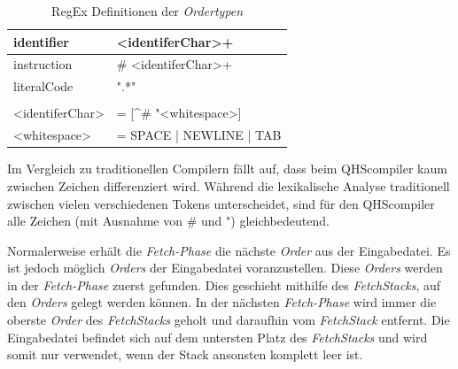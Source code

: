 \begin{table}[h]
    \centering
    \caption{RegEx Definitionen der \textit{Ordertypen}}
    \vspace{3mm} %
    
    \begin{tabular}{l>{\listingFont\selectfont}l}
    \multicolumn{1}{l|}{identifier}        & \textless{}identiferChar\textgreater{}+                           \\ \hline
    \multicolumn{1}{l|}{instruction}       & \# \textless{}identiferChar\textgreater{}+                        \\ \hline
    \multicolumn{1}{l|}{literalCode}       & ".*"                                                              \\
                                           &                                                                   \\
    \textless{}identiferChar\textgreater{} & = {[}\textasciicircum{}\# "\textless{}whitespace\textgreater{}{]} \\
    \textless{}whitespace\textgreater{}    & = SPACE | NEWLINE | TAB
    
    \end{tabular}
\end{table}

Im Vergleich zu traditionellen Compilern fällt auf, dass beim QHScompiler kaum zwischen Zeichen differenziert wird. Während die lexikalische Analyse traditionell zwischen vielen verschiedenen Tokens unterscheidet,
sind für den QHScompiler alle Zeichen (mit Ausnahme von {\listingFont\selectfont \#} und {\listingFont\selectfont "{}}) gleichbedeutend.

Normalerweise erhält die \textit{Fetch-Phase} die nächste \textit{Order} aus der Eingabedatei. 
Es ist jedoch möglich \textit{Orders} der Eingabedatei voranzustellen. Diese \textit{Orders} werden in der \textit{Fetch-Phase} zuerst gefunden. Dies geschieht mithilfe des \textit{FetchStacks}, auf den \textit{Orders} gelegt werden können.
In der nächsten \textit{Fetch-Phase} wird immer die oberste \textit{Order} des \textit{FetchStacks} geholt und daraufhin vom \textit{FetchStack} entfernt.
Die Eingabedatei befindet sich auf dem untersten Platz des \textit{FetchStacks} und wird somit nur verwendet, wenn der Stack ansonsten komplett leer ist.

